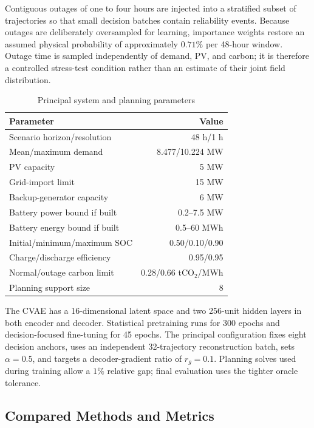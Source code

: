 \documentclass[times]{elsarticle}
\begin{document}
Contiguous outages of one to four hours are injected into a stratified subset
of trajectories so that small decision batches contain reliability events.
Because outages are deliberately oversampled for learning, importance weights
restore an assumed physical probability of approximately $0.71\%$ per 48-hour
window. Outage time is sampled independently of demand, PV, and carbon; it is
therefore a controlled stress-test condition rather than an estimate of their
joint field distribution.

\begin{table}[t]
\centering
\caption{Principal system and planning parameters}
\label{tab:parameters}
\begin{tabular}{@{}lr@{}}
\toprule
Parameter & Value \\
\midrule
Scenario horizon/resolution & 48 h/1 h \\
Mean/maximum demand & 8.477/10.224 MW \\
PV capacity & 5 MW \\
Grid-import limit & 15 MW \\
Backup-generator capacity & 6 MW \\
Battery power bound if built & 0.2--7.5 MW \\
Battery energy bound if built & 0.5--60 MWh \\
Initial/minimum/maximum SOC & 0.50/0.10/0.90 \\
Charge/discharge efficiency & 0.95/0.95 \\
Normal/outage carbon limit & 0.28/0.66 tCO$_2$/MWh \\
Planning support size & 8 \\
\bottomrule
\end{tabular}
\end{table}

The CVAE has a 16-dimensional latent space and two 256-unit hidden layers in
both encoder and decoder. Statistical pretraining runs for 300 epochs and
decision-focused fine-tuning for 45 epochs. The principal configuration fixes
eight decision anchors, uses an independent 32-trajectory reconstruction batch,
sets $\alpha=0.5$, and targets a decoder-gradient ratio of $r_g=0.1$. Planning
solves used during training allow a $1\%$ relative gap; final evaluation uses
the tighter oracle tolerance.

\subsection{Compared Methods and Metrics}
\end{document}
